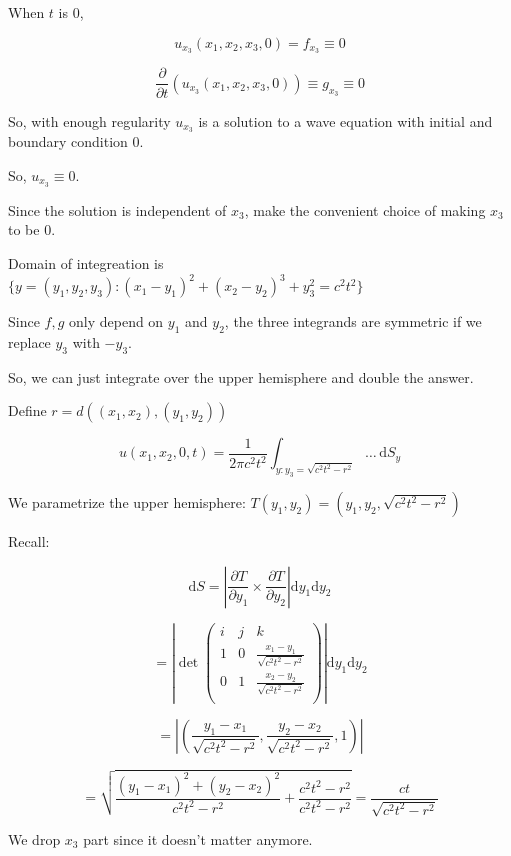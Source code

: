 \documentclass{article}
\theoremstyle{definition}
\begin{document}
When \(t\) is \(0\),

\[
    u_{x_3}(x_1,x_2,x_3,0) = f_{x_3} \equiv 0
\]

\[
    \frac{\partial }{\partial t} (u_{x_3}(x_1,x_2,x_3,0)) \equiv g_{x_3} \equiv 0
\]

So, with enough regularity \(u_{x_3}\) is a solution to a wave equation with initial and boundary condition \(0\).

So, \(u_{x_3} \equiv 0\).

Since the solution is independent of \(x_3\), make the convenient choice of making \(x_3\) to be \(0\).

Domain of integreation is \(\{ y = (y_1,y_2,y_3): (x_1 - y_1)^2 + (x_2 - y_2)^3 + y_3^2 = c^2 t^2 \} \) 

Since \(f,g\) only depend on \(y_1\) and \(y_2\), the three integrands are symmetric if we replace \(y_3\) with \(-y_3\).

So, we can just integrate over the upper hemisphere and double the answer.

Define \(r = d((x_1,x_2),(y_1,y_2))\) 

\[
    u(x_1,x_2,0,t) = \frac{1}{2\pi c^2 t^2} \int_{y : y_3 = \sqrt{c^2 t^2 - r^2} }^{} \dots \,\mathrm{d}S_y 
\]

We parametrize the upper hemisphere: \(T(y_1,y_2) = (y_1, y_2, \sqrt{c^2 t^2 - r^2} )\) 

Recall:

\[
    \mathrm{d} S = \left\vert \frac{\partial T}{\partial y_1} \times \frac{\partial T}{\partial y_2} \right\vert \mathrm{d} y_1 \mathrm{d} y_2
\]

\[
    = \left\vert \det \begin{pmatrix}
        i & j &  k \\
        1 & 0 &  \frac{x_1 - y_1}{\sqrt{c^2 t^2 - r^2} } \\
        0 & 1 &  \frac{x_2 - y_2}{\sqrt{c^2 t^2 - r^2} } \\
    \end{pmatrix} \right\vert \mathrm{d} y_1 \mathrm{d} y_2
\]

\[
    = \left\vert \left( \frac{y_1 - x_1}{\sqrt{c^2 t^2 - r^2} }, \frac{y_2 - x_2}{\sqrt{c^2 t^2 - r^2} }, 1 \right)  \right\vert 
\]

\[
    = \sqrt{\frac{(y_1 - x_1)^2 + (y_2 - x_2)^2}{c^2 t^2 - r^2} + \frac{c^2 t^2 - r^2}{c^2 t^2 - r^2} } = \frac{ct}{\sqrt{c^2 t^2 - r^2} }
\]

We drop \(x_3\) part since it doesn't matter anymore.
\end{document}
